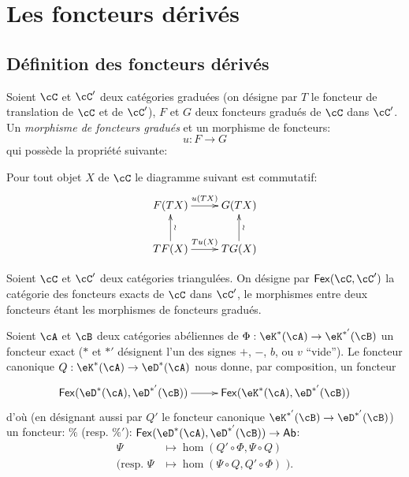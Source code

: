 \section{Les foncteurs dérivés}\label{VIII:4}










\subsection{Définition des foncteurs dérivés}\label{VIII:4-1}





\begin{definition}\label{VIII:4-1-1}
Soient $\cC$ et $\cC'$ deux catégories graduées (on désigne par $T$ le 
foncteur de translation de $\cC$ et de $\cC'$), $F$ et $G$ deux foncteurs 
gradués de $\cC$ dans $\cC'$. Un \emph{morphisme de foncteurs gradués} et 
un morphisme de foncteurs: 
\[
  u:F\to G 
\]
qui possède la propriété suivante: 

Pour tout objet $X$ de $\cC$ le diagramme suivant est commutatif: 
\[\xymatrix{
  F(T X) \ar[r]^-{u(T X)} 
    & G(T X) \\
  T F(X) \ar[r]^-{T u(X)} \ar[u]_-\wr 
    & T G(X) \ar[u]_-\wr 
}\]
\end{definition}

Soient $\cC$ et $\cC'$ deux catégories triangulées. On désigne par 
$\mathsf{Fex}(\cC,\cC')$ la catégorie des foncteurs exacts de $\cC$ dans 
$\cC'$, le morphismes entre deux foncteurs étant les morphismes de foncteurs 
gradués. 

Soient $\cA$ et $\cB$ deux catégories abéliennes de 
$\Phi:\eK^\ast(\cA)\to \eK^{\ast'}(\cB)$ un foncteur exact ($\ast$ et $\ast'$ 
désignent l'un des signes $+$, $-$, $b$, ou $v$ ``vide''). Le foncteur 
canonique $Q:\eK^\ast(\cA)\to \eD^\ast(\cA)$ nous donne, par composition, un 
foncteur 
\[\xymatrix{
  \mathsf{Fex}(\eD^\ast(\cA),\eD^{\ast'}(\cB)) \ar[r] 
    & \mathsf{Fex}(\eK^\ast(\cA),\eD^{\ast'}(\cB)) 
}\]
d'où (en désignant aussi par $Q'$ le foncteur canonique 
$\eK^{\ast'}(\cB) \to \eD^{\ast'}(\cB)$) un foncteur: 
$\%$ (resp. $\%'$): 
$\mathsf{Fex}(\eD^\ast(\cA),\eD^{\ast'}(\cB)) \to \mathsf{Ab}$: 
\begin{align*}
  \Psi  &\mapsto \hom(Q'\circ \Phi,\Psi\circ Q) \\
  (\text{resp. }\Psi &\mapsto \hom(\Psi\circ Q,Q'\circ \Phi)\text{ ).} 
\end{align*}





